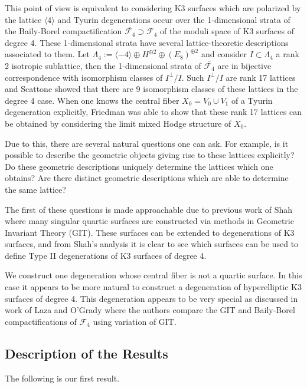\documentclass[a4paper]{amsart}
\theoremstyle{definition}
\theoremstyle{plain}
\theoremstyle{remark}
\begin{document}
This point of view is equivalent to considering K3 surfaces which are polarized by the lattice $\langle4\rangle$ and Tyurin degenerations occur over the 1-dimensional strata of the Baily-Borel compactification $\overline{\mathcal{F}_4}\supset\mathcal{F}_4$ of the moduli space of K3 surfaces of degree 4. These 1-dimensional strata have several lattice-theoretic descriptions associated to them. Let $\Lambda_4:= \langle-4\rangle\oplus H^{\oplus2}\oplus(E_8)^{\oplus2}$ and consider $I\subset \Lambda_4$ a rank 2 isotropic sublattice, then the 1-dimensional strata of $\overline{\mathcal{F}_4}$ are in bijective correspondence with isomorphism classes of $I^\perp/I$. Such $I^\perp/I$ are rank 17 lattices and Scattone \cite{Sca87} showed that there are 9 isomorphism classes of these lattices in the degree 4 case. When one knows the central fiber $X_0=V_0\cup V_1$ of a Tyurin degeneration explicitly, Friedman \cite{Fried84} was able to show that these rank 17 lattices can be obtained by considering the limit mixed Hodge structure of $X_0$.

Due to this, there are several natural questions one can ask. For example, is it possible to describe the geometric objects giving rise to these lattices explicitly? Do these geometric descriptions uniquely determine the lattices which one obtains? Are there distinct geometric descriptions which are able to determine the same lattice?

The first of these questions is made approachable due to previous work of Shah \cite{Shah81} where many singular quartic surfaces are constructed via methods in Geometric Invariant Theory (GIT). These surfaces can be extended to degenerations of K3 surfaces, and from Shah's analysis it is clear to see which surfaces can be used to define Type II degenerations of K3 surfaces of degree 4.

We construct one degeneration whose central fiber is not a quartic surface. In this case it appears to be more natural to construct a degeneration of hyperelliptic K3 surfaces of degree 4. This degeneration appears to be very special as discussed in work of Laza and O'Grady \cite{LOG19,LOG21} where the authors compare the GIT and Baily-Borel compactifications of $\mathcal{F}_4$ using variation of GIT. 

\subsection{Description of the Results}

The following is our first result. 
\end{document}
